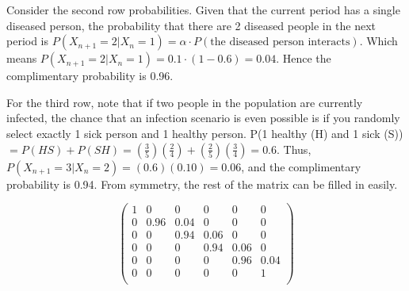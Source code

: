 \documentclass[10pt,a4paper]{article}
\begin{document}
\begin{flushleft}
Consider the second row probabilities.  Given that the current
period has a single diseased person, the probability that there
are 2 diseased people in the next period is $P(X_{n+1}=2|X_n=1) =
\alpha \cdot P(\textrm{the diseased person interacts})$. Which
means $P(X_{n+1}=2|X_n=1) = 0.1 \cdot (1-0.6) = 0.04$. Hence the
complimentary probability is 0.96.

For the third row, note that if two people in the population are currently infected, the chance that an infection scenario is even possible is if you randomly select exactly 1 sick person and 1 healthy person.  P(1 healthy (H) and 1 sick (S))$=P(HS)+P(SH)=\left(\frac{3}{5}\right)\left(\frac{2}{4}\right)+\left(\frac{2}{5}\right)\left(\frac{3}{4}\right)=0.6$.  Thus, $P(X_{n+1}=3|X_n=2)=(0.6)(0.10)=0.06$, and the complimentary probability is 0.94.  From symmetry, the rest of the matrix can be filled in easily.


\[ \left( \begin{array}{cccccc}
1 & 0 & 0 & 0 & 0 & 0  \\
0 & 0.96 &  0.04 & 0 & 0 & 0  \\
0 & 0 & 0.94  & 0.06 & 0 & 0  \\
0 & 0 & 0 & 0.94 & 0.06 & 0  \\
0 & 0 & 0 & 0 & 0.96 & 0.04  \\
0 & 0 & 0 & 0 & 0 & 1  \\
\end{array} \right)\]
\end{flushleft}
\end{document}
